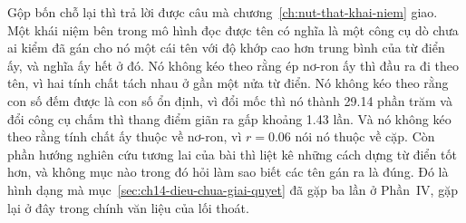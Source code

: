 %
%
Gộp bốn chỗ lại thì trả lời được câu mà
chương~\ref{ch:nut-that-khai-niem} giao. Một khái niệm bên trong mô hình đọc
được tên có nghĩa là một công cụ dò chưa ai kiểm đã gán cho nó một cái tên với
độ khớp cao hơn trung bình của từ điển ấy, và nghĩa ấy hết ở đó. Nó không kéo
theo rằng ép nơ-ron ấy thì đầu ra đi theo tên, vì hai tính chất tách nhau ở gần
một nửa từ điển. Nó không kéo theo rằng con số đếm được là con số ổn định, vì
đổi mốc thì nó thành 29.14 phần trăm và đổi công cụ chấm thì thang điểm giãn ra
gấp khoảng 1.43 lần. Và nó không kéo theo rằng tính chất ấy thuộc về nơ-ron, vì
$r = 0.06$ nói nó thuộc về cặp. Còn phần hướng nghiên cứu tương lai của bài thì
liệt kê những cách dựng từ điển tốt hơn, và không mục nào trong đó hỏi làm sao
biết các tên gán ra là đúng. Đó là hình dạng mà
mục~\ref{sec:ch14-dieu-chua-giai-quyet} đã gặp ba lần ở Phần~IV, gặp lại ở đây
trong chính văn liệu của lối thoát.
